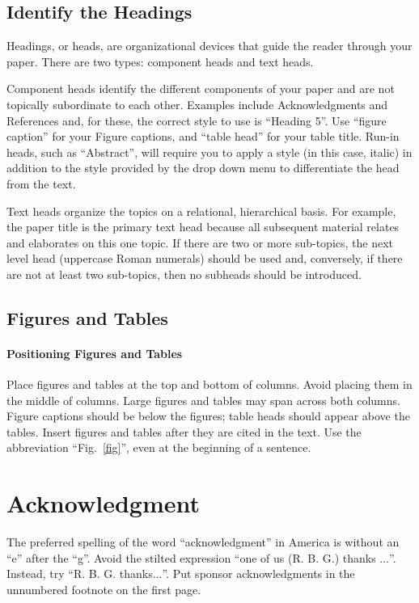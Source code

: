 \documentclass[conference]{IEEEtran}
\begin{document}
\subsection{Identify the Headings}
Headings, or heads, are organizational devices that guide the reader through 
your paper. There are two types: component heads and text heads.

Component heads identify the different components of your paper and are not 
topically subordinate to each other. Examples include Acknowledgments and 
References and, for these, the correct style to use is ``Heading 5''. Use 
``figure caption'' for your Figure captions, and ``table head'' for your 
table title. Run-in heads, such as ``Abstract'', will require you to apply a 
style (in this case, italic) in addition to the style provided by the drop 
down menu to differentiate the head from the text.

Text heads organize the topics on a relational, hierarchical basis. For 
example, the paper title is the primary text head because all subsequent 
material relates and elaborates on this one topic. If there are two or more 
sub-topics, the next level head (uppercase Roman numerals) should be used 
and, conversely, if there are not at least two sub-topics, then no subheads 
should be introduced.

\subsection{Figures and Tables}
\paragraph{Positioning Figures and Tables} Place figures and tables at the top and 
bottom of columns. Avoid placing them in the middle of columns. Large 
figures and tables may span across both columns. Figure captions should be 
below the figures; table heads should appear above the tables. Insert 
figures and tables after they are cited in the text. Use the abbreviation 
``Fig.~\ref{fig}'', even at the beginning of a sentence.


\section*{Acknowledgment}

The preferred spelling of the word ``acknowledgment'' in America is without an ``e'' after the ``g''. Avoid the stilted expression ``one of us (R. B. G.) thanks $\ldots$''. Instead, try ``R. B. G. thanks$\ldots$''. Put sponsor acknowledgments in the unnumbered footnote on the first page.
\end{document}
